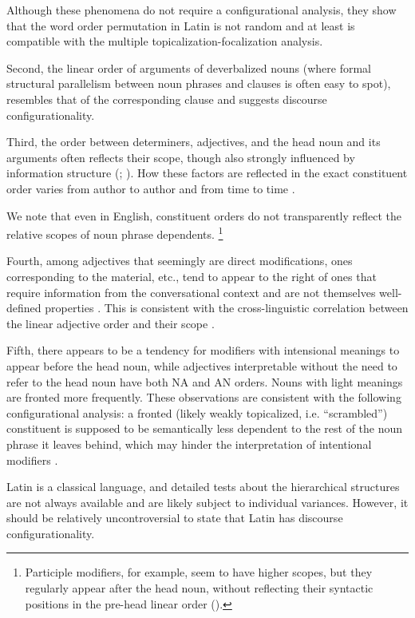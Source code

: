 \documentclass[a4paper, oneside, 12pt]{report}
\newcommand*{\citesec}[1]{\S~{#1}}
\newcommand*{\citechap}[1]{chap.~{#1}}
\newcommand*{\citepage}[1]{p.~{#1}}
\newcommand*{\citepages}[1]{pp.~{#1}}
\begin{document}
Although these phenomena do not require a configurational analysis,
they show that the word order permutation in Latin is not random and at least is compatible with the multiple topicalization-focalization analysis.

Second, the linear order of arguments of deverbalized nouns
(where formal structural parallelism between noun phrases and clauses is often easy to spot),
resembles that of the corresponding clause \citep[\citepage{316-317}]{devine2006latin}
and suggests discourse configurationality.

Third, the order between determiners, adjectives, and the head noun and its arguments often reflects their scope, though also strongly influenced by information structure
(\citealt[\citesec{11.75}]{Pinkster1}; \citealt[\citepage{484}]{devine2006latin}).
How these factors are reflected in the exact constituent order
varies from author to author and from time to time \citep[\citepage{484}]{devine2006latin}.

We note that even in English,
constituent orders do not transparently reflect the relative scopes
of noun phrase dependents.%
\footnote{
    Participle modifiers, for example, seem to have higher scopes,
    but they regularly appear after the head noun,
    without reflecting their syntactic positions in the pre-head linear order
    (\citealt[\citechap{5}]{cinque2010syntax}).
}

Fourth, among adjectives that seemingly are direct modifications,
ones corresponding to the material, etc.,
tend to appear to the right of ones that require information from the conversational context 
and are not themselves well-defined properties \citep[\citepages{481-482}]{devine2006latin}.
This is consistent with the cross-linguistic correlation between the linear adjective order and their scope \citep{cinque2010syntax}.

Fifth, there appears to be a tendency for modifiers with intensional meanings to appear before the head noun,
while adjectives interpretable without the need to refer to the head noun have both NA and AN orders.
Nouns with light meanings are fronted more frequently.
These observations are consistent with the following configurational analysis:
a fronted (likely weakly topicalized, i.e. ``scrambled'') constituent is supposed to be 
semantically less dependent to the rest of the noun phrase it leaves behind,
which may hinder the interpretation of intentional modifiers
\citep[\citepage{485-486}]{devine2006latin}.

Latin is a classical language,
and detailed tests about the hierarchical structures are not always available
and are likely subject to individual variances.
However, it should be relatively uncontroversial to state that Latin has discourse configurationality.
\end{document}
